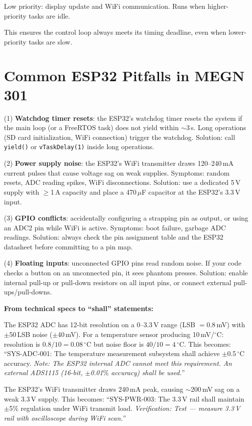 \documentclass[11pt,letterpaper,twoside,openany]{book}
\newcommand{\degC}{\ensuremath{{}^{\circ}\text{C}}}
\begin{document}
Low priority: display update and WiFi communication. Runs when higher-priority tasks are idle.

This ensures the control loop always meets its timing deadline, even when lower-priority tasks are slow.

\section{Common ESP32 Pitfalls in MEGN 301}
(1) \textbf{Watchdog timer resets}: the ESP32's watchdog timer resets the system if the main loop (or a FreeRTOS task) does not yield within $\sim$3\,s. Long operations (SD card initialization, WiFi connection) trigger the watchdog. Solution: call \texttt{yield()} or \texttt{vTaskDelay(1)} inside long operations.

(2) \textbf{Power supply noise}: the ESP32's WiFi transmitter draws 120--240\,mA current pulses that cause voltage sag on weak supplies. Symptoms: random resets, ADC reading spikes, WiFi disconnections. Solution: use a dedicated 5\,V supply with $\geq$1\,A capacity and place a 470\,$\mu$F capacitor at the ESP32's 3.3\,V input.

(3) \textbf{GPIO conflicts}: accidentally configuring a strapping pin as output, or using an ADC2 pin while WiFi is active. Symptoms: boot failure, garbage ADC readings. Solution: always check the pin assignment table and the ESP32 datasheet before committing to a pin map.

(4) \textbf{Floating inputs}: unconnected GPIO pins read random noise. If your code checks a button on an unconnected pin, it sees phantom presses. Solution: enable internal pull-up or pull-down resistors on all input pins, or connect external pull-ups/pull-downs.
\begin{keyconceptbox}
\textbf{From technical specs to ``shall'' statements:}

The ESP32 ADC has 12-bit resolution on a 0--3.3\,V range (LSB $= 0.8$\,mV) with $\pm$50\,LSB noise ($\pm$40\,mV). For a temperature sensor producing 10\,mV/\degC{}: resolution is $0.8/10 = 0.08$\,\degC{} but noise floor is $40/10 = 4$\,\degC{}. This becomes: ``SYS-ADC-001: The temperature measurement subsystem shall achieve $\pm$0.5\,\degC{} accuracy. \emph{Note: The ESP32 internal ADC cannot meet this requirement. An external ADS1115 (16-bit, $\pm$0.01$\%$ accuracy) shall be used.}''

The ESP32's WiFi transmitter draws 240\,mA peak, causing $\sim$200\,mV sag on a weak 3.3\,V supply. This becomes: ``SYS-PWR-003: The 3.3\,V rail shall maintain $\pm$5\% regulation under WiFi transmit load. \emph{Verification: Test --- measure 3.3\,V rail with oscilloscope during WiFi scan.}''
\end{keyconceptbox}
\end{document}
